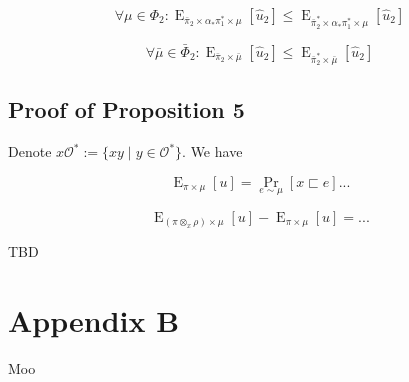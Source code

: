 \documentclass[a4paper]{article}
\DeclareMathOperator{\Prb}{Pr}
\DeclareMathOperator{\E}{E}
\newcommand{\Obs}{\mathcal{O}}
\begin{document}
$$\forall \mu \in \Phi_2: \E_{\bar{\pi}_2 \times \alpha_* \pi^*_1 \times \mu}[\hat{u}_2] \leq \E_{\bar{\pi}^*_2 \times \alpha_* \pi^*_1 \times \mu}[\hat{u}_2]$$

$$\forall \bar{\mu} \in \bar{\Phi}_2: \E_{\bar{\pi}_2 \times \bar{\mu}}[\hat{u}_2] \leq \E_{\bar{\pi}^*_2 \times \bar{\mu}}[\hat{u}_2]$$

\subsection{Proof of Proposition 5}

Denote ${x\Obs^*:=\{xy \mid y \in \Obs^*\}}$. We have

$$\E_{\pi \times \mu}[u] = \Prb_{e \sim \mu}[x \sqsubset e]...$$

$$\E_{(\pi \otimes_x \rho) \times \mu}[u]-\E_{\pi \times \mu}[u] = ...$$

TBD

\section{Appendix B}

Moo
\end{document}
